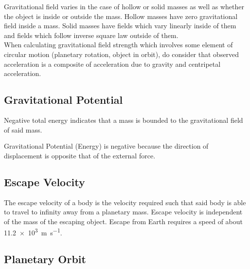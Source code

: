 \documentclass[../main]{subfiles}
\begin{document}
	Gravitational field varies in the case of hollow or solid masses as well as whether the object is inside or outside the mass. Hollow masses have zero gravitational field inside a mass. Solid masses have fields which vary linearly inside of them and fields which follow inverse square law outside of them. \\

	When calculating gravitational field strength which involves some element of circular motion (planetary rotation, object in orbit), do consider that observed acceleration is a composite of acceleration due to gravity and centripetal acceleration.

	\subsection{Gravitational Potential}


	Negative total energy indicates that a mass is bounded to the gravitational field of said mass.


	Gravitational Potential (Energy) is negative because the direction of displacement is opposite that of the external force. 

	\subsection{Escape Velocity}

	The escape velocity of a body is the velocity required such that said body is able to travel to infinity away from a planetary mass. Escape velocity is independent of the mass of the escaping object. Escape from Earth requires a speed of about \SI{11.2e3}{\m\per\s}.


	\subsection{Planetary Orbit}
\end{document}
